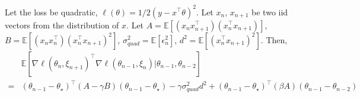 \documentclass[conference]{IEEEtran}
\newcommand{\Ex}[1]{\mathbb{E}[ #1 ]}
\newenvironment{customthm}[1]
   {\renewcommand\theinnercustomthm{#1}\innercustomthm}
   {\endinnercustomthm}
\begin{document}
\begin{customthm}{\ref{thm:quad_diag}}
Let the loss be quadratic, $\ell ( \theta ) = 1/2 ( y - x^\top \theta )^2$. 
Let $x_n$, $x_{n+1}$ be two iid vectors from the distribution of $x$.
Let $A = \Ex{ ( x_n x_{n+1}^\top ) ( x_n^\top x_{n+1} ) }$, $B = \Ex{ ( x_{n} x_n^\top ) ( x_n^\top x_{n+1} )^2 }$, $\sigma_{quad}^2 = \Ex { \epsilon_n^2 }$, $d^2 = \Ex{ ( x_n^\top x_{n+1} )^2 }$.
Then,
\begin{align*}
&\Ex{ \nabla \ell ( \theta_n, \xi_{n+1} )^\top \nabla \ell ( \theta_{n-1}, \xi_n ) |  \theta_{n-1}, \theta_{n-2} }\\
=& ( \theta_{n-1} - \theta_\star )^\top ( A - \gamma B) ( \theta_{n-1} - \theta_\star )
- \gamma \sigma_{quad}^2 d^2  + ( \theta_{n-1} - \theta_\star )^\top ( \beta A ) ( \theta_{n-1} - \theta_{n-2} )
\end{align*}
\end{customthm}
\end{document}
